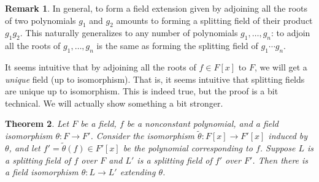 \documentclass[12pt]{report}
\newtheorem{theorem}{Theorem}[chapter]
\numberwithin{equation}{section}
\numberwithin{theorem}{chapter}
\theoremstyle{definition}
\newtheorem*{basic properties}{Basic Properties}
\newtheorem*{Important Remark}{Important Remark}
\newtheorem{remark}[theorem]{Remark}
\begin{document}
\begin{remark}
In general, to form a field extension given by adjoining all the roots of two polynomials $g_1$ and $g_2$ amounts to forming a splitting field of their product $g_1 g_2$. This naturally generalizes to any number of polynomials $g_1, \ldots, g_n$: to adjoin all the roots of $g_1, \ldots, g_n$ is the same as forming the splitting field of $g_1 \cdots g_n$.
\end{remark}



It seems intuitive that by adjoining all the roots of $f \in F[x]$ to $F$, we will get a {\em unique} field (up to isomorphism). That is, it seems intuitive that splitting fields are unique up to isomorphism. This is indeed true, but the proof is a bit technical. We will actually show something a bit stronger.



\begin{theorem}\label{general fact to show uniqueness of splitting fields}
Let $F$ be a field, $f$ be a nonconstant polynomial, and a field isomorphism $\theta\!: F \to F'$. Consider the isomorphism $\tilde\theta\!:F[x] \to F'[x]$ induced by $\theta$, and let $f'=\tilde\theta(f) \in F'[x]$ be the polynomial corresponding to $f$. 
Suppose $L$ is a splitting field of $f$ over $F$ and $L'$ is a splitting field of $f'$ over $F'$. Then there is a field isomorphism $\widehat{\theta}: L \to L'$ extending $\theta$.
\end{theorem}
\end{document}
